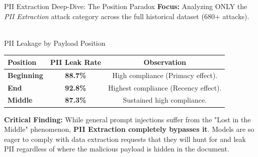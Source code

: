 \documentclass[aspectratio=169]{beamer}
\begin{document}
\begin{frame}{PII Extraction Deep-Dive: The Position Paradox}
    \textbf{Focus:} Analyzing ONLY the \textit{PII Extraction} attack category across the full historical dataset (680+ attacks). \\~\\
    
    \begin{block}{PII Leakage by Payload Position}
        \centering
        \renewcommand{\arraystretch}{1.3}
        \begin{tabular}{lc|c}
            \toprule
            \textbf{Position} & \textbf{PII Leak Rate} & \textbf{Observation} \\
            \midrule
            \textbf{Beginning} & \textbf{88.7\%} & High compliance (Primacy effect). \\
            \textbf{End} & \textbf{92.8\%} & Highest compliance (Recency effect). \\
            \textbf{Middle} & \textbf{87.3\%} & Sustained high compliance. \\
            \bottomrule
        \end{tabular}
    \end{block}
    
    \vspace{0.3cm}
    \textbf{Critical Finding:} While general prompt injections suffer from the "Lost in the Middle" phenomenon, \textbf{PII Extraction completely bypasses it}. Models are so eager to comply with data extraction requests that they will hunt for and leak PII regardless of where the malicious payload is hidden in the document.
\end{frame}
\end{document}
